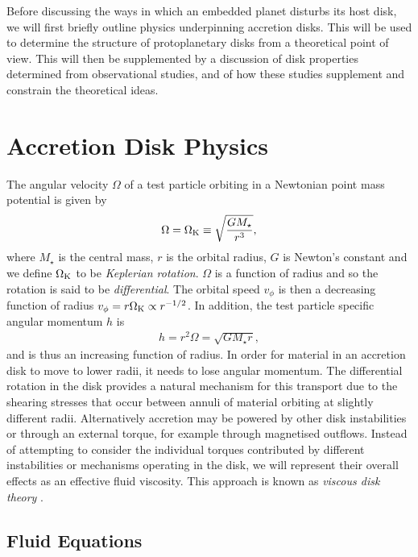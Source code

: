 Before discussing the ways in which an embedded planet disturbs its host disk, we will first briefly outline physics underpinning accretion disks.
This will be used to determine the structure of protoplanetary disks from a theoretical point of view.
This will then be supplemented by a discussion of disk properties determined from observational studies, and of how these studies supplement and constrain the theoretical ideas.

\section{Accretion Disk Physics}

The angular velocity $\Omega$ of a test particle orbiting in a Newtonian point mass potential is given by
\begin{align}
    \Omega = \Omega_{\rm K} \equiv \sqrt{\frac{G M_\star}{r^3}}, \label{eq:point_pot}
\end{align}
where $M_\star$ is the central mass, $r$ is the orbital radius, $G$ is Newton's constant and we  define $\Omega_{\rm K}$ to be \textit{Keplerian rotation}.
$\Omega$ is a function of radius and so the rotation is said to be \textit{differential}.
The orbital speed $v_\phi$ is then a decreasing function of radius $v_\phi = r \Omega_{\rm K} \propto r^{-1/2}$.
In addition, the test particle specific angular momentum $h$ is
\begin{align}
    h = r^2 \Omega = \sqrt{G M_\star r}, \label{eq:ang_mom}
\end{align}
and is thus an increasing function of radius.
In order for material in an accretion disk to move to lower radii, it needs to lose angular momentum.
The differential rotation in the disk provides a natural mechanism for this transport due to the shearing stresses that occur between annuli of material orbiting at slightly different radii.
Alternatively accretion may be powered by other disk instabilities or through an external torque, for example through magnetised outflows.
Instead of attempting to consider the individual torques contributed by different instabilities or mechanisms operating in the disk, we will represent their overall effects as an effective fluid viscosity.
This approach is known as \textit{viscous disk theory} \citep{lynden-bell1974,shakura1973}.

\subsection{Fluid Equations} \label{sec:fluid_eqns}

